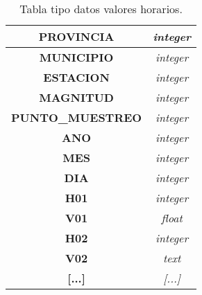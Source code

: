     \begin{table}[H]
    	\begin{center}
    		\begin{tabular}{|c|c|}
    			\hline
    			\textbf{PROVINCIA}       & \textit{integer}              \\ \hline
    			\textbf{MUNICIPIO}       & \textit{integer}              \\ \hline
    			\textbf{ESTACION}        & \textit{integer}               \\ \hline
    			\textbf{MAGNITUD}        & \textit{integer}               \\ \hline
    			\textbf{PUNTO\_MUESTREO} & \textit{integer} \\ \hline
    			\textbf{ANO}             & \textit{integer}            \\ \hline
    			\textbf{MES}             & \textit{integer}               \\ \hline
    			\textbf{DIA}             & \textit{integer}               \\ \hline
    			\textbf{H01}             & \textit{integer}              \\ \hline
    			\textbf{V01}             & \textit{float}               \\ \hline
    			\textbf{H02}             & \textit{integer}              \\ \hline
    			\textbf{V02}             & \textit{text}               \\ \hline
    			\textbf{[...]}             & \textit{[...]}               \\ \hline
    		\end{tabular}
    		\caption{Tabla tipo datos valores horarios.}
    	\end{center}
    \end{table}


